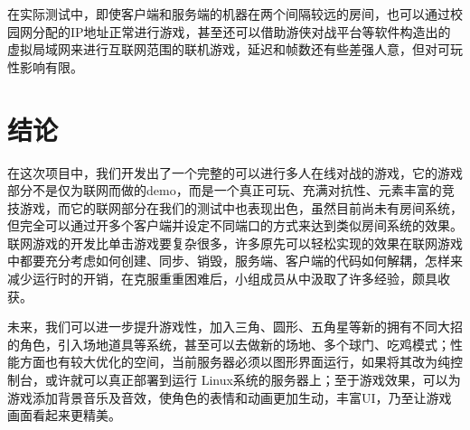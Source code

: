 \documentclass[conference]{IEEEtran}
\begin{document}
  在实际测试中，即使客户端和服务端的机器在两个间隔较远的房间，也可以通过校园网分配的IP地址正常进行游戏，甚至还可以借助游侠对战平台等软件构造出的虚拟局域网来进行互联网范围的联机游戏，延迟和帧数还有些差强人意，但对可玩性影响有限。

\section{结论}
在这次项目中，我们开发出了一个完整的可以进行多人在线对战的游戏，它的游戏部分不是仅为联网而做的demo，而是一个真正可玩、充满对抗性、元素丰富的竞技游戏，而它的联网部分在我们的测试中也表现出色，虽然目前尚未有房间系统，但完全可以通过开多个客户端并设定不同端口的方式来达到类似房间系统的效果。联网游戏的开发比单击游戏要复杂很多，许多原先可以轻松实现的效果在联网游戏中都要充分考虑如何创建、同步、销毁，服务端、客户端的代码如何解耦，怎样来减少运行时的开销，在克服重重困难后，小组成员从中汲取了许多经验，颇具收获。

未来，我们可以进一步提升游戏性，加入三角、圆形、五角星等新的拥有不同大招的角色，引入场地道具等系统，甚至可以去做新的场地、多个球门、吃鸡模式；性能方面也有较大优化的空间，当前服务器必须以图形界面运行，如果将其改为纯控制台，或许就可以真正部署到运行 Linux系统的服务器上；至于游戏效果，可以为游戏添加背景音乐及音效，使角色的表情和动画更加生动，丰富UI，乃至让游戏画面看起来更精美。




\end{document}
